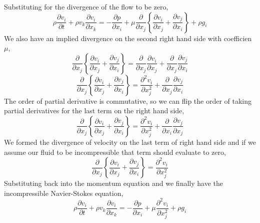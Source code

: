 Substituting for the divergence of the flow to be zero,
$$\rho\frac{\partial v_{i}}{\partial t} + \rho v_{k}\frac{\partial v_{i}}{\partial x_{k}} = -\frac{\partial p}{\partial x_{i}} + \mu\frac{\partial}{\partial x_{j}}\left\{ \frac{\partial v_{i}}{\partial x_{j}} + \frac{\partial v_{j}}{\partial x_{i}} \right\}  +  \rho g_{i}$$
We also have an implied divergence on the second right hand side with coefficien $\mu$,
$$\frac{\partial}{\partial x_{j}}\left\{ \frac{\partial v_{i}}{\partial x_{j}} + \frac{\partial v_{j}}{\partial x_{i}} \right\} = \frac{\partial}{\partial x_{j}}\frac{\partial v_{i}}{\partial x_{j}} + \frac{\partial}{\partial x_{j}}\frac{\partial v_{j}}{\partial x_{i}}$$
$$\frac{\partial}{\partial x_{j}}\left\{ \frac{\partial v_{i}}{\partial x_{j}} + \frac{\partial v_{j}}{\partial x_{i}} \right\} = \frac{\partial^{2} v_{i}}{\partial x_{j}^{2}} + \frac{\partial}{\partial x_{j}}\frac{\partial v_{j}}{\partial x_{i}}$$
The order of partial derivative is commutative, so we can flip the order of taking partial derivatives for the last term on the right hand side,
$$\frac{\partial}{\partial x_{j}}\left\{ \frac{\partial v_{i}}{\partial x_{j}} + \frac{\partial v_{j}}{\partial x_{i}} \right\} = \frac{\partial^{2} v_{i}}{\partial x_{j}^{2}} + \frac{\partial}{\partial x_{i}}\frac{\partial v_{j}}{\partial x_{j}}$$
We formed the divergence of velocity on the last term of right hand side and if we assume our fluid to be incompressible that term should evaluate to zero,
$$\frac{\partial}{\partial x_{j}}\left\{ \frac{\partial v_{i}}{\partial x_{j}} + \frac{\partial v_{j}}{\partial x_{i}} \right\} = \frac{\partial^{2} v_{i}}{\partial x_{j}^{2}}$$
Substituting back into the momentum equation and we finally have the incompressible Navier-Stokes equation,
\begin{equation}
\rho\frac{\partial v_{i}}{\partial t} + \rho v_{k}\frac{\partial v_{i}}{\partial x_{k}} = -\frac{\partial p}{\partial x_{i}} + \mu \frac{\partial^{2} v_{i}}{\partial x_{j}^{2}} + \rho g_{i} 
\label{Incompressible Navier-Stokes Momentum Equation}
\end{equation}



